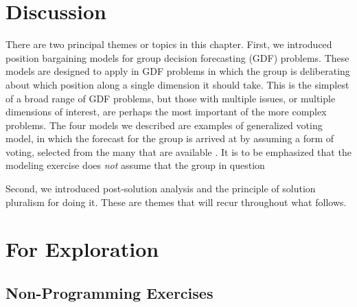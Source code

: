 \clearpage\newpage


\section{Discussion}

There are two principal themes or topics in this chapter. First, we introduced position bargaining models for group decision forecasting (GDF) problems. These models are designed to  apply in GDF problems in which the group is deliberating about which position along a single dimension it should take. This is the simplest of a broad range of GDF problems, but those with multiple issues, or multiple dimensions of interest, are perhaps the most important of the more complex problems. The four models we described are examples of   {generalized voting model}, in which the forecast for the group is arrived at by assuming a form of voting, selected from the many that are available \cite{pacuit_2012}. It is to be emphasized that the modeling exercise does \emph{not} assume that the group in question 

Second, we introduced post-solution analysis and the principle of solution pluralism for doing it. These are themes that will recur throughout what follows.

%
%

\section{For Exploration}

\subsection{Non-Programming Exercises}

